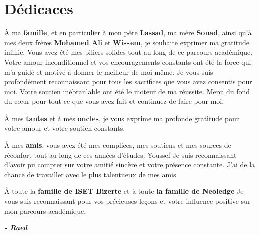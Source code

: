 \section*{Dédicaces}


\begin{fquote}
  \begin{center}
  \large{
  
À ma \textbf{famille}, et en particulier à mon père \textbf{Lassad}, ma mère \textbf{Souad}, ainsi qu'à mes deux frères \textbf{Mohamed Ali} et \textbf{Wissem}, je souhaite exprimer ma gratitude infinie. Vous avez été mes piliers solides tout au long de ce parcours académique. Votre amour inconditionnel et vos encouragements constants ont été la force qui m'a guidé et motivé à donner le meilleur de moi-même. Je vous suis profondément reconnaissant pour tous les sacrifices que vous avez consentis pour moi. Votre soutien inébranlable ont été le moteur de ma réussite. Merci du fond du cœur pour tout ce que vous avez fait et continuez de faire pour moi.
\smallskip

À mes \textbf{tantes} et à mes \textbf{oncles}, je vous exprime ma profonde gratitude pour votre amour et votre soutien constants.

\smallskip

À mes \textbf{amis}, vous avez été mes complices, mes soutiens et mes sources de réconfort tout au long de ces années d'études. Youssef Je suis reconnaissant d'avoir pu compter sur votre amitié sincère et votre présence constante. J'ai de la chance de travailler avec le plus talentueux de mes amis  
\smallskip

À toute la \textbf{famille de ISET Bizerte} et à toute \textbf{la famille de Neoledge} Je vous suis reconnaissant pour vos précieuses leçons et votre influence positive sur mon parcours académique. 
}
\end{center}
\end{fquote}
\begin{adjustwidth}{2cm}{1cm}
  \hspace*{\fill} \textbf{\textit{\large{- Raed}}}
\end{adjustwidth}


\clearpage
